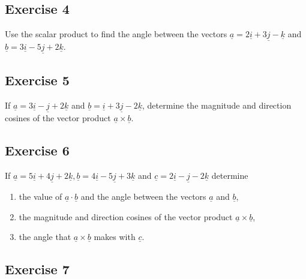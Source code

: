 \documentclass[
  11pt,
  oneside]{book}
\providecommand{\tightlist}{%
  \setlength{\itemsep}{0pt}\setlength{\parskip}{0pt}}
\newcommand{\slide}{}
\theoremstyle{definition}
\theoremstyle{definition}
\theoremstyle{definition}
\theoremstyle{definition}
\theoremstyle{remark}
\begin{document}
\slide

\subsection*{Exercise 4}\label{exercise-4-10}

Use the scalar product to find the angle between the vectors \(\underline{a}=2\underline{i} + 3\underline{j} - \underline{k}\) and \(\underline{b}=3\underline{i} - 5\underline{j} + 2\underline{k}\).

\slide

\subsection*{Exercise 5}\label{exercise-5-8}

If \(\underline{a} = 3\underline{i} - \underline{j} + 2\underline{k}\) and \(\underline{b} = \underline{i} + 3\underline{j} - 2\underline{k}\), determine the magnitude and direction cosines of the vector product \(\underline{a} \times \underline{b}\).

\slide

\subsection*{Exercise 6}\label{exercise-6-6}

If \(\underline{a} = 5\underline{i} + 4\underline{j} + 2\underline{k}, \underline{b} = 4\underline{i} - 5\underline{j} + 3\underline{k}\) and \(\underline{c} = 2\underline{i} - \underline{j} - 2\underline{k}\) determine

\begin{enumerate}
\def\labelenumi{\arabic{enumi}.}
\tightlist
\item
  the value of \(\underline{a} \cdot \underline{b}\) and the angle between the vectors \(\underline{a}\) and \(\underline{b}\),
\item
  the magnitude and direction cosines of the vector product \(\underline{a} \times \underline{b}\),
\item
  the angle that \(\underline{a} \times \underline{b}\) makes with \(\underline{c}\).
\end{enumerate}

\slide

\subsection*{Exercise 7}\label{exercise-7-3}
\end{document}
